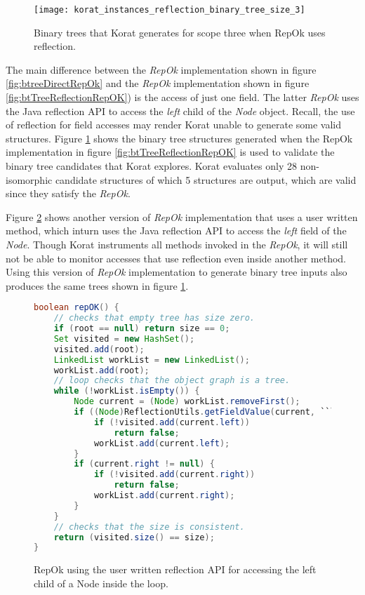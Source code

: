 \begin{figure}
\centering
\texttt{[image: korat\_instances\_reflection\_binary\_tree\_size\_3]}
\caption{ Binary trees that Korat generates for scope three when RepOk uses reflection.}
\label{fig:btreeReflectKoratGenScopeThree}
\end{figure}

\para The main difference between the \emph{RepOk} implementation
shown in figure \ref{fig:btreeDirectRepOk} and the \emph{RepOk}
implementation shown in figure \ref{fig:btTreeReflectionRepOK}) is the
access of just one field. The latter \emph{RepOk} uses the Java
reflection API to access the \emph{left} child of the \emph{Node}
object.  Recall, the use of reflection for field accesses may render
Korat unable to generate some valid structures. Figure
\ref{fig:btreeReflectKoratGenScopeThree} shows the binary tree
structures generated when the RepOk implementation in figure
\ref{fig:btTreeReflectionRepOK} is used to validate the binary tree
candidates that Korat explores. Korat evaluates only 28 non-isomorphic
candidate structures of which 5 structures are output, which are valid
since they satisfy the \emph{RepOk}.


\para Figure \ref{fig:btTreeUserReflectionRepOK} shows another version
of \emph{RepOk} implementation that uses a user written method, which
inturn uses the Java reflection API to access the \emph{left} field of
the \emph{Node}. Though Korat instruments all methods invoked in the
\emph{RepOk}, it will still not be able to monitor accesses that use
reflection even inside another method. Using this version of
\emph{RepOk} implementation to generate binary tree inputs also
produces the same trees shown in figure
\ref{fig:btreeReflectKoratGenScopeThree}.

\begin{figure}
\centering
\begin{lstlisting}[language=Java]
boolean repOK() {
    // checks that empty tree has size zero.
    if (root == null) return size == 0;
    Set visited = new HashSet();
    visited.add(root);
    LinkedList workList = new LinkedList();
    workList.add(root);
    // loop checks that the object graph is a tree.
    while (!workList.isEmpty()) {
        Node current = (Node) workList.removeFirst();
        if ((Node)ReflectionUtils.getFieldValue(current, ``left'') != null) {
            if (!visited.add(current.left))
                return false;
            workList.add(current.left);
        }
        if (current.right != null) {
            if (!visited.add(current.right))
                return false;
            workList.add(current.right);
        }
    }
    // checks that the size is consistent.
    return (visited.size() == size);
}
\end{lstlisting}
\caption{RepOk using the user written reflection API for accessing the left child of a Node inside the loop.}
\label{fig:btTreeUserReflectionRepOK}
\end{figure}


